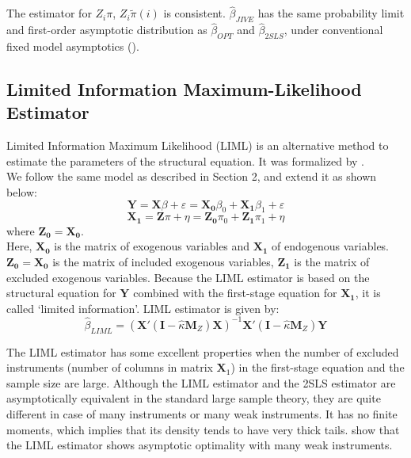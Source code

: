 The estimator for $Z_i\pi$, $Z_{i}\tilde{\pi}(i)$ is consistent.
$\hat{\beta}_{JIVE}$ has the same probability limit and first-order asymptotic distribution as $\hat{\beta}_{OPT}$ and $\hat{\beta}_{2SLS}$, under conventional fixed model asymptotics (\cite{stock2002survey}).

\subsection{Limited Information Maximum-Likelihood Estimator}

Limited Information Maximum Likelihood (LIML) is an alternative method to estimate the parameters of the structural equation. It was formalized by \cite{anderson1949estimation}.\\
We follow the same model as described in Section 2, and extend it as shown below: 
\begin{equation}
 \mathbf{Y} = \mathbf{X}\beta + \varepsilon = \mathbf{X_0}\beta_0 + \mathbf{X_1}\beta_1 + \varepsilon
\end{equation}
\begin{equation}
 \mathbf{X_1} = \mathbf{Z}\pi + \eta = \mathbf{Z_0}\pi_0 + \mathbf{Z_1}\pi_1 + \eta
\end{equation}
where $\mathbf{Z_0} = \mathbf{X_0}$.\\
Here, $\mathbf{X_0}$ is the matrix of exogenous variables and $\mathbf{X_1}$ of endogenous variables. $\mathbf{Z_0} = \mathbf{X_0}$ is the matrix of included exogenous variables, $\mathbf{Z_1}$ is the matrix of excluded exogenous variables.
Because the LIML estimator is based on the structural equation for $\mathbf{Y}$ combined with the first-stage equation for $\mathbf{X_1}$, it is called `limited information'. LIML estimator is given by:
\begin{equation}
\hat\beta_{LIML}=(\mathbf X'(\mathbf I-\hat\kappa \mathbf M_Z)\mathbf X)^{-1}\mathbf X'(\mathbf I-\hat\kappa \mathbf M_Z)\mathbf Y
\end{equation}
\par The LIML estimator has some excellent properties when the number of excluded instruments (number of columns in matrix $\mathbf X_1$) in the first-stage equation and the sample size are large. Although the LIML estimator and the 2SLS estimator are asymptotically equivalent in the standard large sample theory, they are quite different in case of many instruments or many weak instruments. It has no finite moments, which implies that its density tends to have very thick tails. \cite{anderson2010asymptotic} show that the LIML estimator shows asymptotic optimality with many weak instruments.